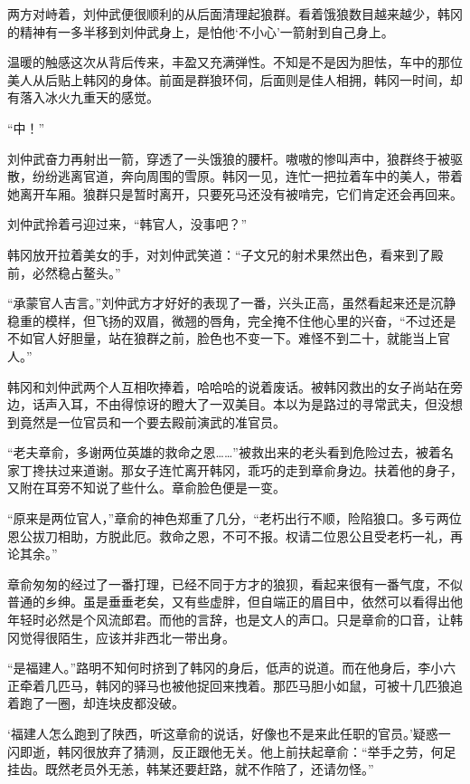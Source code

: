 两方对峙着，刘仲武便很顺利的从后面清理起狼群。看着饿狼数目越来越少，韩冈的精神有一多半移到刘仲武身上，是怕他‘不小心’一箭射到自己身上。

温暖的触感这次从背后传来，丰盈又充满弹性。不知是不是因为胆怯，车中的那位美人从后贴上韩冈的身体。前面是群狼环伺，后面则是佳人相拥，韩冈一时间，却有落入冰火九重天的感觉。

“中！”

刘仲武奋力再射出一箭，穿透了一头饿狼的腰杆。嗷嗷的惨叫声中，狼群终于被驱散，纷纷逃离官道，奔向周围的雪原。韩冈一见，连忙一把拉着车中的美人，带着她离开车厢。狼群只是暂时离开，只要死马还没有被啃完，它们肯定还会再回来。

刘仲武拎着弓迎过来，“韩官人，没事吧？”

韩冈放开拉着美女的手，对刘仲武笑道：“子文兄的射术果然出色，看来到了殿前，必然稳占鳌头。”

“承蒙官人吉言。”刘仲武方才好好的表现了一番，兴头正高，虽然看起来还是沉静稳重的模样，但飞扬的双眉，微翘的唇角，完全掩不住他心里的兴奋，“不过还是不如官人好胆量，站在狼群之前，脸色也不变一下。难怪不到二十，就能当上官人。”

韩冈和刘仲武两个人互相吹捧着，哈哈哈的说着废话。被韩冈救出的女子尚站在旁边，话声入耳，不由得惊讶的瞪大了一双美目。本以为是路过的寻常武夫，但没想到竟然是一位官员和一个要去殿前演武的准官员。

“老夫章俞，多谢两位英雄的救命之恩……”被救出来的老头看到危险过去，被着名家丁搀扶过来道谢。那女子连忙离开韩冈，乖巧的走到章俞身边。扶着他的身子，又附在耳旁不知说了些什么。章俞脸色便是一变。

“原来是两位官人，”章俞的神色郑重了几分，“老朽出行不顺，险陷狼口。多亏两位恩公拔刀相助，方脱此厄。救命之恩，不可不报。权请二位恩公且受老朽一礼，再论其余。”

章俞匆匆的经过了一番打理，已经不同于方才的狼狈，看起来很有一番气度，不似普通的乡绅。虽是垂垂老矣，又有些虚胖，但自端正的眉目中，依然可以看得出他年轻时必然是个风流郎君。而他的言辞，也是文人的声口。只是章俞的口音，让韩冈觉得很陌生，应该并非西北一带出身。

“是福建人。”路明不知何时挤到了韩冈的身后，低声的说道。而在他身后，李小六正牵着几匹马，韩冈的驿马也被他捉回来拽着。那匹马胆小如鼠，可被十几匹狼追着跑了一圈，却连块皮都没破。

‘福建人怎么跑到了陕西，听这章俞的说话，好像也不是来此任职的官员。’疑惑一闪即逝，韩冈很放弃了猜测，反正跟他无关。他上前扶起章俞：“举手之劳，何足挂齿。既然老员外无恙，韩某还要赶路，就不作陪了，还请勿怪。”

